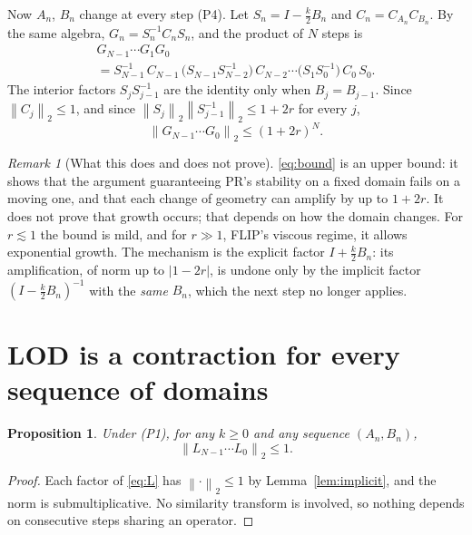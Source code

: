 \documentclass[11pt]{article}
\newtheorem{proposition}{Proposition}
\theoremstyle{remark}
\newtheorem*{remark}{Remark}
\newcommand{\norm}[1]{\left\lVert #1 \right\rVert}
\newcommand{\Id}{I}
\begin{document}
Now $A_n$, $B_n$ change at every step (P4). Let $S_n = \Id - \tfrac{k}{2}B_n$ and $C_n = C_{A_n} C_{B_n}$. By the same algebra, $G_n = S_n^{-1} C_n S_n$, and the product of $N$ steps is
\begin{multline}
  G_{N-1}\cdots G_1 G_0 \\
  = S_{N-1}^{-1}\, C_{N-1}\, \bigl(S_{N-1} S_{N-2}^{-1}\bigr)\, C_{N-2} \cdots \bigl(S_1 S_0^{-1}\bigr)\, C_0\, S_0 .
  \label{eq:product}
\end{multline}
The interior factors $S_{j} S_{j-1}^{-1}$ are the identity only when $B_j = B_{j-1}$. Since $\norm{C_j}_2 \le 1$, and since $\norm{S_j}_2 \norm{S_{j-1}^{-1}}_2 \le 1 + 2r$ for every $j$,
\begin{equation}
  \norm{G_{N-1}\cdots G_0}_2 \le (1 + 2r)^{N}.
  \label{eq:bound}
\end{equation}

\begin{remark}[What this does and does not prove]
\eqref{eq:bound} is an upper bound: it shows that the argument guaranteeing PR's stability on a fixed domain fails on a moving one, and that each change of geometry can amplify by up to $1 + 2r$. It does not prove that growth occurs; that depends on how the domain changes. For $r \lesssim 1$ the bound is mild, and for $r \gg 1$, FLIP's viscous regime, it allows exponential growth. The mechanism is the explicit factor $\Id + \tfrac{k}{2}B_n$: its amplification, of norm up to $|1 - 2r|$, is undone only by the implicit factor $(\Id - \tfrac{k}{2}B_n)^{-1}$ with the \emph{same} $B_n$, which the next step no longer applies.
\end{remark}

\section{LOD is a contraction for every sequence of domains}

\begin{proposition}\label{prop:lod}
Under (P1), for any $k \ge 0$ and any sequence $(A_n, B_n)$,
\begin{equation}
  \norm{L_{N-1}\cdots L_0}_2 \le 1 .
\end{equation}
\end{proposition}
\begin{proof}
Each factor of \eqref{eq:L} has $\norm{\cdot}_2 \le 1$ by Lemma~\ref{lem:implicit}, and the norm is submultiplicative. No similarity transform is involved, so nothing depends on consecutive steps sharing an operator.
\end{proof}
\end{document}
